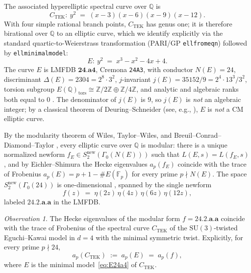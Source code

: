 \documentclass[11pt]{amsart}
\theoremstyle{definition}
\theoremstyle{remark}
\newtheorem*{observation}{Observation}
\newcommand{\Q}{\mathbb{Q}}
\newcommand{\Z}{\mathbb{Z}}
\newcommand{\F}{\mathbb{F}}
\newcommand{\SU}{\mathrm{SU}}
\newcommand{\TEK}{\mathrm{TEK}}
\begin{document}
The associated hyperelliptic spectral curve over \(\Q\) is
\begin{equation}\label{eq:spectral}
  C_{\TEK}\colon \ y^{2} \;=\; (x-3)(x-6)(x-9)(x-12).
\end{equation}
With four simple rational branch points, \(C_{\TEK}\) has genus one;
it is therefore birational over \(\Q\) to an elliptic curve, which we
identify explicitly via the standard quartic-to-Weierstrass
transformation (PARI/GP \texttt{ellfromeqn}) followed by
\texttt{ellminimalmodel}:
\begin{equation}\label{eq:E24a4}
  E\colon \ y^{2} \;=\; x^{3} - x^{2} - 4x + 4.
\end{equation}
The curve \(E\) is LMFDB \(\mathbf{24.a4}\), Cremona \texttt{24A3},
with conductor \(N(E) = 24\), discriminant
\(\Delta(E) = 2304 = 2^{8}\cdot 3^{2}\), \(j\)-invariant
\(j(E) = 35152/9 = 2^{4}\cdot 13^{3}/3^{2}\), torsion subgroup
\(E(\Q)_{\mathrm{tors}} \cong \Z/2\Z \oplus \Z/4\Z\), and analytic and
algebraic ranks both equal to \(0\) \cite{LMFDB}.
The denominator of \(j(E)\) is \(9\), so \(j(E)\) is \emph{not} an
algebraic integer; by a classical theorem of Deuring--Schneider
(see, e.g., \cite[Ch.~II, Thm.~6.1]{Silverman2009}), \(E\) is
\emph{not} a CM elliptic curve.

By the modularity theorem of Wiles, Taylor--Wiles, and
Breuil--Conrad--Diamond--Taylor \cite{Wiles1995,TaylorWiles1995,
BCDT2001}, every elliptic curve over \(\Q\) is modular: there is a
unique normalized newform \(f_{E} \in S_{2}^{\mathrm{new}}
(\Gamma_{0}(N(E)))\) such that
\(L(E, s) = L(f_{E}, s)\), and by Eichler--Shimura
\cite[Ch.~7]{Shimura1971} the Hecke eigenvalues \(a_{p}(f_{E})\)
coincide with the trace of Frobenius
\(a_{p}(E) = p + 1 - \#E(\F_{p})\) for every prime
\(p \nmid N(E)\). The space \(S_{2}^{\mathrm{new}}(\Gamma_{0}(24))\)
is one-dimensional \cite{LMFDB}, spanned by the
single newform
\begin{equation}\label{eq:f24}
  f(z) \;=\; \eta(2z)\,\eta(4z)\,\eta(6z)\,\eta(12z),
\end{equation}
labeled \(\mathbf{24.2.a.a}\) in the LMFDB.

\begin{observation}\label{obs:main}
The Hecke eigenvalues of the modular form \(f = \mathbf{24.2.a.a}\)
coincide with the trace of Frobenius of the spectral curve
\(C_{\TEK}\) of the \(\SU(3)\)-twisted Eguchi--Kawai model in \(d=4\)
with the minimal symmetric twist. Explicitly, for every prime
\(p \nmid 24\),
\[
  a_{p}(C_{\TEK}) \;:=\; a_{p}(E) \;=\; a_{p}(f),
\]
where \(E\) is the minimal model~\eqref{eq:E24a4} of \(C_{\TEK}\).
\end{observation}
\end{document}
